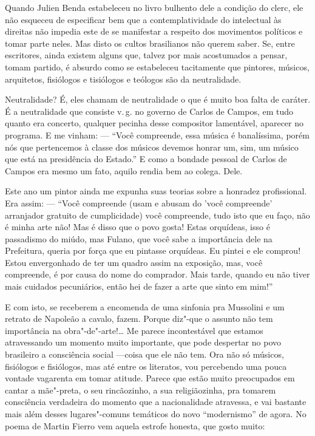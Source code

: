 Quando Julien Benda estabeleceu no livro bulhento dele a condição do
clerc, ele não esqueceu de especificar bem que a contemplatividade do
intelectual às direitas não impedia este de se manifestar a respeito dos
movimentos políticos e tomar parte neles. Mas disto os cultos
brasilianos não querem saber. Se, entre escritores, ainda existem alguns
que, talvez por mais acostumados a pensar, tomam partido, é absurdo como
se estabeleceu tacitamente que pintores, músicos, arquitetos, fisiólogos
e tisiólogos e teólogos são da neutralidade.

Neutralidade? É, eles chamam de neutralidade o que é muito boa falta de
caráter. É a neutralidade que consiste v.\,g. no governo de Carlos de
Campos, em tudo quanto era concerto, qualquer pecinha desse compositor
lamentável, aparecer no programa. E me vinham: --- ``Você compreende, essa
música é banalíssima, porém nós que pertencemos à classe dos músicos
devemos honrar um, sim, um músico que está na presidência do Estado.'' E
como a bondade pessoal de Carlos de Campos era mesmo um fato, aquilo
rendia bem ao colega. Dele.

Este ano um pintor ainda me expunha suas teorias sobre a honradez
profissional. Era assim: --- ``Você compreende (usam e abusam do 'você
compreende' arranjador gratuito de cumplicidade) você compreende, tudo
isto que eu faço, não é minha arte não! Mas é disso que o povo gosta!
Estas orquídeas, isso é passadismo do miúdo, mas Fulano, que você sabe a
importância dele na Prefeitura, queria por força que eu pintasse
orquídeas. Eu pintei e ele comprou! Estou envergonhado de ter um quadro
assim na exposição, mas, você compreende, é por causa do nome do
comprador. Mais tarde, quando eu não tiver mais cuidados pecuniários,
então hei de fazer a arte que sinto em mim!''

E com isto, se receberem a encomenda de uma sinfonia pra Mussolini e um
retrato de Napoleão a cavalo, fazem. Porque diz"-que o assunto não tem
importância na obra"-de"-arte!\ldots{} Me parece incontestável que estamos
atravessando um momento muito importante, que pode despertar no povo
brasileiro a consciência social ---coisa que ele não tem. Ora não só
músicos, fisiólogos e fisiólogos, mas até entre os literatos, vou
percebendo uma pouca vontade vagarenta em tomar atitude. Parece que
estão muito preocupados em cantar a mãe"-preta, o seu rincãozinho, a sua
religiãozinha, pra tomarem consciência verdadeira do momento que a
nacionalidade atravessa, e vai bastante mais além desses lugares"-comuns
temáticos do novo ``modernismo'' de agora. No poema de Martin Fierro vem
aquela estrofe honesta, que gosto muito:

